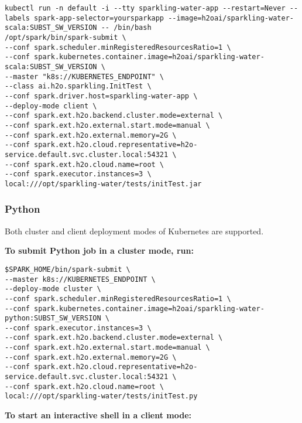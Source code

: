 \begin{lstlisting}[style=Bash]
kubectl run -n default -i --tty sparkling-water-app --restart=Never --labels spark-app-selector=yoursparkapp --image=h2oai/sparkling-water-scala:SUBST_SW_VERSION -- /bin/bash
/opt/spark/bin/spark-submit \
--conf spark.scheduler.minRegisteredResourcesRatio=1 \
--conf spark.kubernetes.container.image=h2oai/sparkling-water-scala:SUBST_SW_VERSION \
--master "k8s://KUBERNETES_ENDPOINT" \
--class ai.h2o.sparkling.InitTest \
--conf spark.driver.host=sparkling-water-app \
--deploy-mode client \
--conf spark.ext.h2o.backend.cluster.mode=external \
--conf spark.ext.h2o.external.start.mode=manual \
--conf spark.ext.h2o.external.memory=2G \
--conf spark.ext.h2o.cloud.representative=h2o-service.default.svc.cluster.local:54321 \
--conf spark.ext.h2o.cloud.name=root \
--conf spark.executor.instances=3 \
local:///opt/sparkling-water/tests/initTest.jar
\end{lstlisting}


\subsubsection{Python}

Both cluster and client deployment modes of Kubernetes are supported.

\textbf{To submit Python job in a cluster mode, run:}

\begin{lstlisting}[style=Bash]
$SPARK_HOME/bin/spark-submit \
--master k8s://KUBERNETES_ENDPOINT \
--deploy-mode cluster \
--conf spark.scheduler.minRegisteredResourcesRatio=1 \
--conf spark.kubernetes.container.image=h2oai/sparkling-water-python:SUBST_SW_VERSION \
--conf spark.executor.instances=3 \
--conf spark.ext.h2o.backend.cluster.mode=external \
--conf spark.ext.h2o.external.start.mode=manual \
--conf spark.ext.h2o.external.memory=2G \
--conf spark.ext.h2o.cloud.representative=h2o-service.default.svc.cluster.local:54321 \
--conf spark.ext.h2o.cloud.name=root \
local:///opt/sparkling-water/tests/initTest.py
\end{lstlisting}

\textbf{To start an interactive shell in a client mode:}

